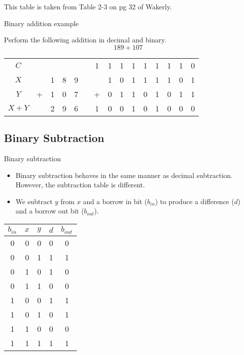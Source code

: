 This table is taken from Table 2-3 on pg 32 of Wakerly.

\begin{frame}{Binary addition example}
  \begin{example}
    Perform the following addition in decimal and binary.
    $$189 + 107$$
  \end{example}
\end{frame}

\begin{tabular}{ccccccccccccccc}
  $C$   &   &   &   &   & & 1 & 1 & 1 & 1 & 1 & 1 & 1 & 1 & 0 \\
  $X$   &   & 1 & 8 & 9 & &   & 1 & 0 & 1 & 1 & 1 & 1 & 0 & 1 \\
  $Y$   & + & 1 & 0 & 7 & & + & 0 & 1 & 1 & 0 & 1 & 0 & 1 & 1 \\
  \hline
  $X+Y$ &   & 2 & 9 & 6 & & 1 & 0 & 0 & 1 & 0 & 1 & 0 & 0 & 0 \\
\end{tabular}

\subsection{Binary Subtraction}

\begin{frame}{Binary subtraction}
  \begin{itemize}
    \item Binary subtraction behaves in the same manner as decimal subtraction.  However, the subtraction table is different.
    \item We subtract $y$ from $x$ and a borrow in bit ($b_{in}$) to produce a difference ($d$) and a borrow out bit ($b_{out}$).
  \end{itemize}
  \begin{center}
      \begin{tabular}{ccc|cc}
        $b_{in}$ & $x$ & $y$ & $d$ & $b_{out}$\\
        \hline
        0 & 0 & 0 & 0 & 0 \\
        0 & 0 & 1 & 1 & 1 \\
        0 & 1 & 0 & 1 & 0 \\
        0 & 1 & 1 & 0 & 0 \\
        1 & 0 & 0 & 1 & 1 \\
        1 & 0 & 1 & 0 & 1 \\
        1 & 1 & 0 & 0 & 0 \\
        1 & 1 & 1 & 1 & 1 \\
      \end{tabular}
  \end{center}
\end{frame}

